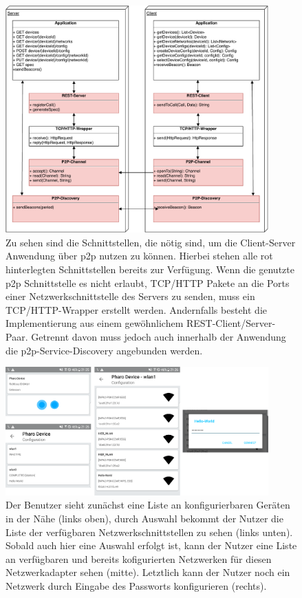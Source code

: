 \documentclass[12pt,a4paper]{article}
\begin{document}
	\begin{figure}[ht]
		\centering
	    \includegraphics[width=0.9\textwidth]{IOT-Connectivity-Protocol-Stack}
    	\caption{Zu sehen sind die Schnittstellen, die nötig sind, um die Client-Server Anwendung über p2p nutzen zu können. Hierbei stehen alle rot hinterlegten Schnittstellen bereits zur Verfügung. Wenn die genutzte p2p Schnittstelle es nicht erlaubt, TCP/HTTP Pakete an die Ports einer Netzwerkschnittstelle des Servers zu senden, muss ein TCP/HTTP-Wrapper erstellt werden. Andernfalls besteht die Implementierung aus einem gewöhnlichem REST-Client/Server-Paar. Getrennt davon muss jedoch auch innerhalb der Anwendung die p2p-Service-Discovery angebunden werden. }
	    \label{protocol_stack}
	\end{figure}    
    
    
    
    \begin{figure}[ht]
		\centering
	    \includegraphics[width=0.9\textwidth]{user_flow.png}
    	\caption{ Der Benutzer sieht zunächst eine Liste an konfigurierbaren Geräten in der Nähe (links oben), durch Auswahl bekommt der Nutzer die Liste der verfügbaren Netzwerkschnittstellen zu sehen (links unten). Sobald auch hier eine Auswahl erfolgt ist, kann der Nutzer eine Liste an verfügbaren und bereits kofigurierten Netzwerken für diesen Netzwerkadapter sehen (mitte). Letztlich kann der Nutzer noch ein Netzwerk durch Eingabe des Passworts konfigurieren (rechts).}
	    \label{protocol_stack}
	\end{figure}      
    
\end{document}
